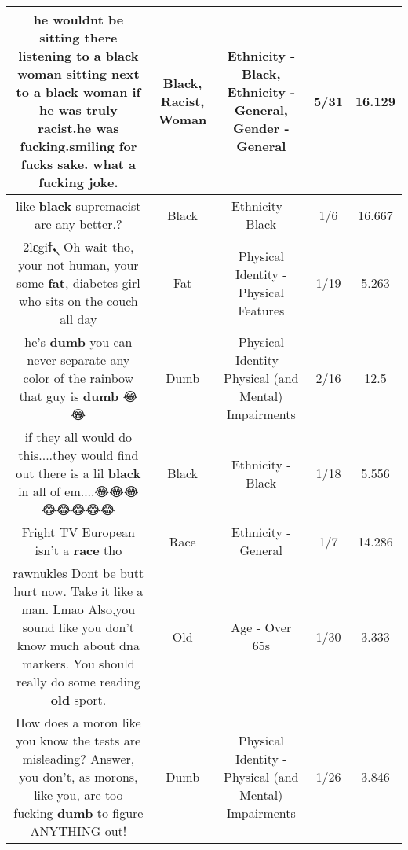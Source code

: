 \documentclass[11pt]{article}
\newlength\mylength
\begin{document}
\begin{center}
\begin{longtable}{|C{.65\mylength}|C{.30\mylength}|C{.12\mylength}|C{.12\mylength}|C{.12\mylength}|}
  \small he wouldnt be sitting there listening to a \textbf{black} \textbf{woman} sitting next to a \textbf{black} \textbf{woman} if he was truly \textbf{racist}.he was fucking.smiling for fucks sake. what a fucking joke.\normalsize   & Black, Racist, Woman & Ethnicity - Black, Ethnicity - General, Gender - General & 5/31 & 16.129 \\  \hline
  \small like \textbf{black} supremacist are any better.?\normalsize   & Black & Ethnicity - Black & 1/6 & 16.667 \\  \hline
  \small 2lεgiϯܢ  Oh wait tho, your not human, your some \textbf{fat}, diabetes girl who sits on the couch all day\normalsize   & Fat & Physical Identity - Physical Features & 1/19 & 5.263 \\  \hline
  \small he's \textbf{dumb} you can never separate any color of the  rainbow that guy is \textbf{dumb} 😂😂\normalsize   & Dumb & Physical Identity - Physical (and Mental) Impairments & 2/16 & 12.5 \\  \hline
  \small if they all would do this....they would find out there is a lil \textbf{black} in all of em....😂😂😂😂😂😂😂😂\normalsize   & Black & Ethnicity - Black & 1/18 & 5.556 \\  \hline
  \small Fright TV European isn't a \textbf{race} tho\normalsize   & Race & Ethnicity - General & 1/7 & 14.286 \\  \hline
  \small rawnukles Dont be butt hurt now. Take it like a man. Lmao Also,you sound like you don't know much about dna markers. You should really do some reading \textbf{old} sport.\normalsize   & Old & Age - Over 65s & 1/30 & 3.333 \\  \hline
  \small How does a moron like  you know the tests are misleading?  Answer, you don't, as morons, like you, are too fucking \textbf{dumb} to figure ANYTHING out!\normalsize   & Dumb & Physical Identity - Physical (and Mental) Impairments & 1/26 & 3.846 \\  \hline

\end{longtable}
\end{center}
\end{document}
